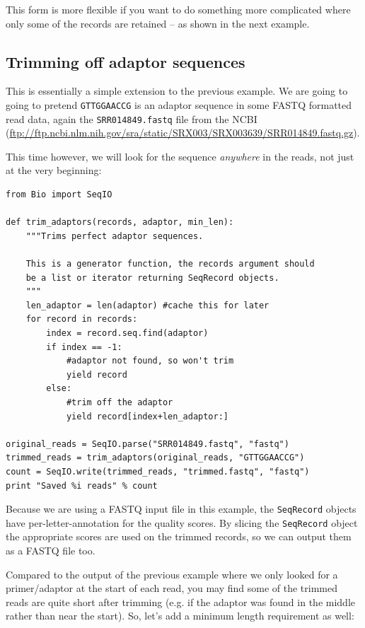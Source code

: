 \documentclass{report}
\begin{document}
This form is more flexible if you want to do something more complicated
where only some of the records are retained -- as shown in the next example.

\subsection{Trimming off adaptor sequences}
\label{sec:FASTQ-slicing-off-adaptor}

This is essentially a simple extension to the previous example. We are going
to going to pretend \texttt{GTTGGAACCG} is an adaptor sequence in some FASTQ
formatted read data, again the \texttt{SRR014849.fastq} file from the NCBI
(\url{ftp://ftp.ncbi.nlm.nih.gov/sra/static/SRX003/SRX003639/SRR014849.fastq.gz}).

This time however, we will look for the sequence \emph{anywhere} in the reads,
not just at the very beginning:

\begin{verbatim}
from Bio import SeqIO

def trim_adaptors(records, adaptor, min_len):
    """Trims perfect adaptor sequences.
    
    This is a generator function, the records argument should
    be a list or iterator returning SeqRecord objects.
    """
    len_adaptor = len(adaptor) #cache this for later
    for record in records:
        index = record.seq.find(adaptor)
        if index == -1:
            #adaptor not found, so won't trim
            yield record
        else:
            #trim off the adaptor
            yield record[index+len_adaptor:]

original_reads = SeqIO.parse("SRR014849.fastq", "fastq")
trimmed_reads = trim_adaptors(original_reads, "GTTGGAACCG")
count = SeqIO.write(trimmed_reads, "trimmed.fastq", "fastq") 
print "Saved %i reads" % count
\end{verbatim}

Because we are using a FASTQ input file in this example, the \verb|SeqRecord|
objects have per-letter-annotation for the quality scores. By slicing the
\verb|SeqRecord| object the appropriate scores are used on the trimmed
records, so we can output them as a FASTQ file too.

Compared to the output of the previous example where we only looked for
a primer/adaptor at the start of each read, you may find some of the
trimmed reads are quite short after trimming (e.g. if the adaptor was
found in the middle rather than near the start). So, let's add a minimum
length requirement as well:
\end{document}
